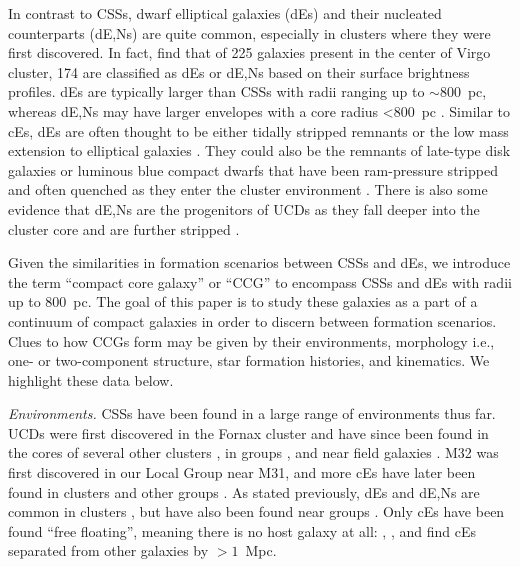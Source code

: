 \documentclass[iop,apj]{emulateapj}
\begin{document}
In contrast to CSSs, dwarf elliptical galaxies (dEs) and their nucleated counterparts (dE,Ns) are quite common, especially in clusters where they were first discovered. In fact, \citet{Binggeli1991} find that of 225 galaxies present in the center of Virgo cluster, 174 are classified as dEs or dE,Ns based on their surface brightness profiles. dEs are typically larger than CSSs with radii ranging up to $\sim800$~pc, whereas dE,Ns may have larger envelopes with a core radius <$800$~pc \citep[e.g.,][]{Norris2014}. Similar to cEs, dEs are often thought to be either tidally stripped remnants \citep{Crnojevi2014} or the low mass extension to elliptical galaxies \citep{Kormendy2012a}. They could also be the remnants of late-type disk galaxies or luminous blue compact dwarfs that have been ram-pressure stripped and often quenched as they enter the cluster environment \citep{Lisker2013, Crawford2016}. There is also some evidence that dE,Ns are the progenitors of UCDs as they fall deeper into the cluster core and are further stripped \citep{Pfeffer2013,Zhang2015,Liu2015}.

Given the similarities in formation scenarios between CSSs and dEs, we introduce the term ``compact core galaxy'' or ``CCG'' to encompass CSSs and dEs with radii up to 800~pc. The goal of this paper is to study these galaxies as a part of a continuum of compact galaxies in order to discern between formation scenarios. Clues to how CCGs form may be given by their environments,  morphology i.e., one- or two-component structure, star formation histories, and kinematics. We highlight these data below.

\textit{Environments.} CSSs have been found in a large range of environments thus far. UCDs were first discovered in the Fornax cluster \citep{Hilker1999, Drinkwater2000} and have since been found in the cores of several other clusters \citep{Price2009,Madrid2010,Jones2006,Mieske2009,Misgeld2008}, in groups \citep{Evstigneeva2007}, and near field galaxies \citep{Hau2009,Norris2011}. M32 was first discovered in our Local Group \citep{Faber1973} near M31, and more cEs have later been found in clusters \citep{Chilingarian2007,SmithCastelli2012,Price2009} and other groups \citep{Huxor2011,Chilingarian2010}. As stated previously, dEs and dE,Ns are common in clusters \citep{SmithCastelli2012,Koo1994,Guzman1996,Crawford2016}, but have also been found near groups \citep{Crnojevi2014,Penny2014}. Only cEs have been found ``free floating'', meaning there is no host galaxy at all: \citet{Huxor2013}, \citet{Paudel2014}, and \citet{Chilingarian2015} find cEs separated from other galaxies by $>1$~Mpc. 
\end{document}
